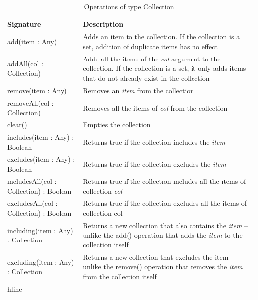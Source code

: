 \begin{longtable} {|p{5.5cm}|p{6.5cm}|}
			
			\caption{Operations of type Collection}
			\label{tab:Collection Operations}\\
			
			\hline
							
			\textbf{Signature} & \textbf{Description} \\\hline

			add(item : Any) & Adds an item to the collection. If the collection is a set, addition of duplicate items has no effect \\\hline
			
			addAll(col : Collection) & Adds all the items of the \emph{col} argument to the collection. If the collection is a set, it only adds items that do not already exist in the collection\\\hline
		
			remove(item : Any) & Removes an \emph{item} from the collection \\\hline
			
			removeAll(col : Collection) & Removes all the items of \emph{col} from the collection \\\hline
			
			clear() & Empties the collection \\\hline
			
			includes(item : Any) : Boolean & Returns true if the collection includes the \emph{item} \\\hline
			
			excludes(item : Any) : Boolean & Returns true if the collection excludes the \emph{item} \\\hline
			
			includesAll(col : Collection) : Boolean & Returns true if the collection includes all the items of collection \emph{col} \\\hline
			
			excludesAll(col : Collection) : Boolean & Returns true if the collection excludes all the items of collection col \\\hline
			
			including(item : Any) : Collection & Returns a new collection that also contains the \emph{item} -- unlike the add() operation that adds the \emph{item} to the collection itself  \\\hline
			
			excluding(item : Any) : Collection & Returns a new collection that excludes the item -- unlike the remove() operation that removes the \emph{item} from the collection itself\\hline
			

\end{longtable}
